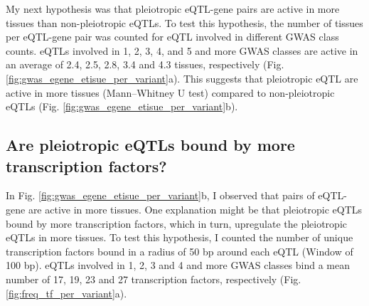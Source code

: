 My next hypothesis was that pleiotropic eQTL-gene pairs are active in more tissues than non-pleiotropic eQTLs.
%
To test this hypothesis, the number of tissues per eQTL-gene pair was counted for eQTL involved in different GWAS class counts.
%
eQTLs involved in 1, 2, 3, 4, and 5 and more GWAS classes are active in an average of 2.4, 2.5, 2.8, 3.4 and 4.3 tissues, respectively (Fig. \ref{fig:gwas_egene_etisue_per_variant}a).
%
This suggests that pleiotropic eQTL are active in more tissues (Mann–Whitney U test) compared to non-pleiotropic eQTLs (Fig. \ref{fig:gwas_egene_etisue_per_variant}b).

%
%

%
\subsection*{Are pleiotropic eQTLs bound by more transcription factors?}
%

In Fig. \ref{fig:gwas_egene_etisue_per_variant}b, I observed that pairs of eQTL-gene are active in more tissues.
%
One explanation might be that pleiotropic eQTLs bound by more transcription factors, which in turn, upregulate the pleiotropic eQTLs in more tissues.
%
To test this hypothesis, I counted the number of unique transcription factors bound in a radius of 50 bp around each eQTL (Window of 100 bp).
%
eQTLs involved in 1, 2, 3 and 4 and more GWAS classes bind a mean number of 17,
19, 23 and 27 transcription factors, respectively (Fig. \ref{fig:freq_tf_per_variant}a).

